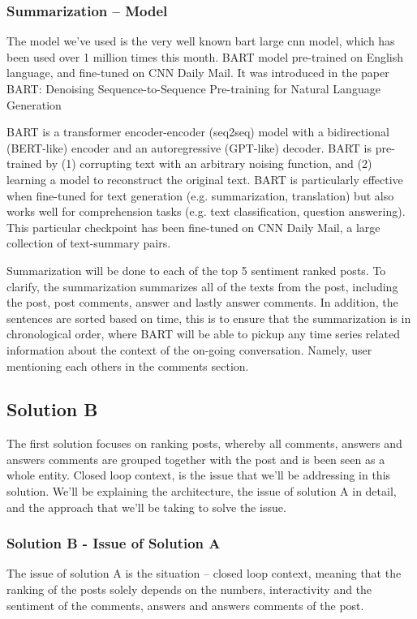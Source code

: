 \subsubsection{Summarization -- Model} %
The model we've used is the very well known bart large cnn model, which has been used over 1 million times this month. BART model pre-trained on English language, and fine-tuned on CNN Daily Mail. It was introduced in the paper BART: Denoising Sequence-to-Sequence Pre-training for Natural Language Generation

BART is a transformer encoder-encoder (seq2seq) model with a bidirectional (BERT-like) encoder and an autoregressive (GPT-like) decoder. BART is pre-trained by (1) corrupting text with an arbitrary noising function, and (2) learning a model to reconstruct the original text. BART is particularly effective when fine-tuned for text generation (e.g. summarization, translation) but also works well for comprehension tasks (e.g. text classification, question answering). This particular checkpoint has been fine-tuned on CNN Daily Mail, a large collection of text-summary pairs.

Summarization will be done to each of the top 5 sentiment ranked posts. To clarify, the summarization summarizes all of the texts from the post, including the post, post comments, answer and lastly answer comments. In addition, the sentences are sorted based on time, this is to ensure that the summarization is in chronological order, where BART will be able to pickup any time series related information about the context of the on-going conversation. Namely, user mentioning each others in the comments section.

\pagebreak
\subsection{Solution B}
The first solution focuses on ranking posts, whereby all comments, answers and answers comments are grouped together with the post and is been seen as a whole entity. Closed loop context, is the issue that we'll be addressing in this solution. We'll be explaining the architecture, the issue of solution A in detail, and the approach that we'll be taking to solve the issue.

\subsubsection{Solution B - Issue of Solution A}
The issue of solution A is the situation -- closed loop context, meaning that the ranking of the posts solely depends on the numbers, interactivity and the sentiment of the comments, answers and answers comments of the post. 

